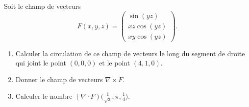 
\begin{exercice}\label{exoOutilsMath-0091}

    Soit le champ de vecteurs
    \begin{equation}
        F(x,y,z)=\begin{pmatrix}
            \sin(yz)    \\ 
            xz\cos(yz)    \\ 
            xy\cos(yz)    
        \end{pmatrix}.
    \end{equation}
    \begin{enumerate}
        \item
            Calculer la circulation de ce champ de vecteurs le long du segment de droite qui joint le point $(0,0,0)$ et le point $(4,1,0)$.
        \item
            Donner le champ de vecteurs $\nabla\times F$.
        \item
            Calculer le nombre $(\nabla\cdot F)\big( \frac{1}{ \sqrt{3} },\pi,\frac{1}{ 4 } \big)$.
    \end{enumerate}

\end{exercice}
